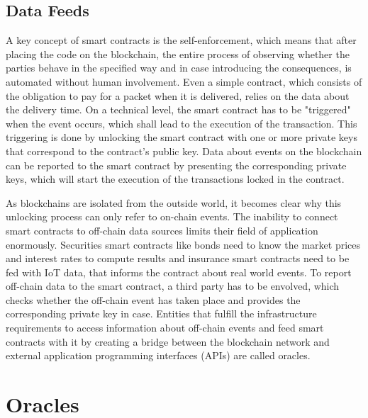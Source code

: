 \documentclass[conference]{IEEEtran}
\begin{document}
\subsection{Data Feeds}
A key concept of smart contracts is the self-enforcement, which means that after placing the code on the blockchain, the entire process of observing whether the parties behave in the specified way and in case introducing the consequences, is automated without human involvement. Even a simple contract, which consists of the obligation to pay for a packet when it is delivered, relies on the data about the delivery time. On a technical level, the smart contract has to be "triggered" when the event occurs, which shall lead to the execution of the transaction. This triggering is done by unlocking the smart contract with one or more private keys that correspond to the contract's public key. Data about events on the blockchain can be reported to the smart contract by presenting the corresponding private keys, which will start the execution of the transactions locked in the contract. \cite{Mik2017} \par
As blockchains are isolated from the outside world, it becomes clear why this unlocking process can only refer to on-chain events. The inability to connect smart contracts to off-chain data sources limits their field of application enormously. Securities smart contracts like bonds need to know the market prices and interest rates to compute results and insurance smart contracts need to be fed with IoT data, that informs the contract about real world events. To report off-chain data to the smart contract, a third party has to be envolved, which checks whether the off-chain event has taken place and provides the corresponding private key in case. Entities that fulfill the infrastructure requirements to access information about off-chain events and feed smart contracts with it by creating a bridge between the blockchain network and external application programming interfaces (APIs) are called oracles. \cite{Mik2017} \cite{Ellis2017} \cite{Thomas2014} \par  
 
\section{Oracles}
\end{document}
